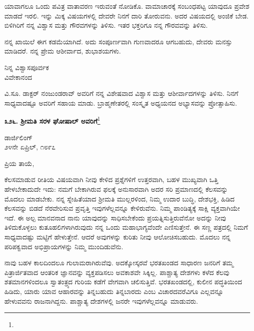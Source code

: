 \vspace{0.1cm}

ಯಾವಾಗಲೂ ಒಂದು ಪವಿತ್ರ ವಾತಾವರಣ ಇರುವಂತೆ ನೋಡಿಕೊ. ವಾಮಾಚಾರಕ್ಕೆ ಸಂಬಂಧಪಟ್ಟ ಯಾವುದೂ ಪ್ರವೇಶ ಮಾಡದೆ ಇರಲಿ. ಇನ್ನು ಮಿಕ್ಕ ವಿಷಯಗಳಲ್ಲಿ ದೇವರೇ ನಿನಗೆ ದಾರಿ ತೋರುವನು. ಅದರ ವಿಷಯದಲ್ಲಿ ಅಂಜಿಕೆ ಬೇಡ. ಬಿಳಿಗಿರಿಗೆ ನನ್ನ ವಿಶ್ವಾಸ ಮತ್ತು ಗೌರವಗಳನ್ನು ತಿಳಿಸು. ಇತರ ಭಕ್ತರಿಗೂ\enginline{-} ನನ್ನ ಗೌರವವನ್ನು ತಿಳಿಸು.

\newpage

ನನ್ನ ಖಾಯಿಲೆ ಈಗ ಕಡಮೆಯಾಗಿದೆ. ಅದು ಸಂಪೂರ್ಣವಾಗಿ ಗುಣವಾದರೂ ಆಗಬಹುದು, ದೇವರು ಮನಸ್ಸು ಮಾಡಿದರೆ. ನನ್ನ ಪ್ರೇಮ ಆಶೀರ್ವಾದ, ಶುಭಾಶಯಗಳು.

\begin{flushright}
ನಿನ್ನ ವಿಶ್ವಾಸಪೂರ್ವಕ\\ವಿವೇಕಾನಂದ
\end{flushright}

ವಿ.ಸೂ. ಡಾಕ್ಟರ್ ನಂಜುಂಡರಾವ್ ಅವರಿಗೆ ನನ್ನ ವಿಶೇಷವಾದ ವಿಶ್ವಾಸ ಮತ್ತು ಆಶೀರ್ವಾದಗಳನ್ನು ತಿಳಿಸು. ನಿನಗೆ ಸಾಧ್ಯವಾದಷ್ಟೂ ಅವರಿಗೆ ಸಹಾಯ ಮಾಡು. ಬ್ರಾಹ್ಮಣೇತರಲ್ಲಿ ಸಂಸ್ಕೃತ ಅಧ್ಯಯನದ ಅಭ್ಯಾಸವನ್ನು ಪ್ರೋತ್ಸಾಹಿಸು.

\begin{center}
\textbf{೩೨೬. ಶ‍್ರೀಮತಿ ಸರಳ ಘೋಷಾಲ್ ಅವರಿಗೆ}\footnote{}
\end{center}

\begin{flushright}
ಡಾರ್ಜಿಲಿಂಗ್\\೨೪ನೇ ಏಪ್ರಿಲ್, ೧೮೯೭
\end{flushright}

\noindent
ಪ್ರಿಯ ತಾಯೆ,

ಕೆಲಸಮಾಡುವ ರೀತಿಯ ವಿಷಯವಾಗಿ ನೀವು ಕೇಳಿದ ಪ್ರಶ್ನೆಗಳಿಗೆ ಉತ್ತರವಾಗಿ, ಬಹಳ ಮುಖ್ಯವಾಗಿ ಒತ್ತಿ ಹೇಳಬೇಕಾದುದೇ ಇದು: ನಮಗೆ ಬೇಕಾಗಿರುವ ಫಲಕ್ಕೆ ಅನುಸಾರವಾಗಿ ಅದರ ಸರಿ ಪ್ರಮಾಣದಲ್ಲಿ ಕೆಲಸವನ್ನು ಮೊದಲು ಮಾಡಬೇಕು. ನನ್ನ ಸ್ನೇಹಿತೆಯಾದ ಶ‍್ರೀಮತಿ ಮುಲ್ಲರಳಿಂದ, ನಿಮ್ಮ ಉದಾರ ಬುದ್ಧಿ, ದೇಶಭಕ್ತಿ, ಹಿಡಿದ ಕೆಲಸವನ್ನು ಬಿಡದೆ ನೆರವೇರಿಸುವ ಪ್ರವೃತ್ತಿ ಇವುಗಳೆಲ್ಲವನ್ನೂ ಕೇಳಿರುವೆನು. ನಿಮ್ಮ ಪಾಂಡಿತ್ಯಕ್ಕೆ ಸಾಕ್ಷಿ ವ್ಯಕ್ತವಾಗಿಯೇ ಇದೆ. ಈ ಅಲ್ಪ ಮಾನವನಾದ ನಾನು ಯಾವುದನ್ನು ಸಾಧಿಸಬೇಕೆಂದು ಪ್ರಯತ್ನಿಸುತ್ತಿರುವೆನೋ ಅದನ್ನು ನೀವು ತಿಳಿದುಕೊಳ್ಳಲು ಕುತೂಹಲಿಗಳಾಗಿರುವುದು ನನ್ನ ಒಂದು ಮಹಾಭಾಗ್ಯವೆಂದೇ ಎಣಿಸುತ್ತೇನೆ. ಈ ಸಣ್ಣ ಪತ್ರದಲ್ಲಿ ನಿಮಗೆ ಸಾಧ್ಯವಾದಷ್ಟು ಮಟ್ಟಿಗೆ ಹೇಳುತ್ತೇನೆ. ಆದರೆ ಅವುಗಳನ್ನು ಕುರಿತು ನೀವು ಆಲೋಚಿಸಬಹುದು. ಮೊದಲು ನನ್ನ ಪರಿಪಕ್ವವಾದ ಅಭಿಪ್ರಾಯಗಳನ್ನು ನಿಮ್ಮ ಮುಂದಿಡುವೆನು.

ನಾವು ಬಹಳ ಕಾಲದಿಂದಲೂ ಗುಲಾಮರಾಗಿರುವೆವು. ಅದಕ್ಕೋಸ್ಕರವೆ ಭರತಖಂಡದ ಸಾಧಾರಣ ಜನರಿಗೆ ತಮ್ಮ ಪಿತ್ರಾರ್ಜಿತವಾದ ಆಂತರಿಕ ಜ್ಞಾನವನ್ನು ವ್ಯಕ್ತಪಡಿಸಲು ಅವಕಾಶವೇ ಸಿಕ್ಕಿಲ್ಲ. ಪಾಶ್ಚಾತ್ಯ ದೇಶಗಳು ಕಳೆದ ಕೆಲವು ಶತಮಾನಗಳಿಂದಲೂ ಸ್ವಾತಂತ್ರ್ಯದ ಗುರಿಯ ಕಡೆಗೆ ವೇಗವಾಗಿ ಚಲಿಸುತ್ತಿವೆ. ಭರತಖಂಡದಲ್ಲಿ, ಕುಲೀನ ಪದ್ಧತಿಯಿಂದ ಹಿಡಿದು, ಯಾರು ಯಾವ ಆಹಾರವನ್ನು ತಿನ್ನಬಹುದು ತಿನ್ನಬಾರದು ಎಂಬ ವಿಚಾರದವರೆವಿಗೂ ಎಲ್ಲವನ್ನೂ ಹೇಳುವವನು ರಾಜನಾಗಿದ್ದನು. ಪಾಶ್ಚಾತ್ಯ ದೇಶಗಳಲ್ಲಿ ಜನರೇ ಇವುಗಳೆಲ್ಲವನ್ನೂ ಮಾಡುವರು.

